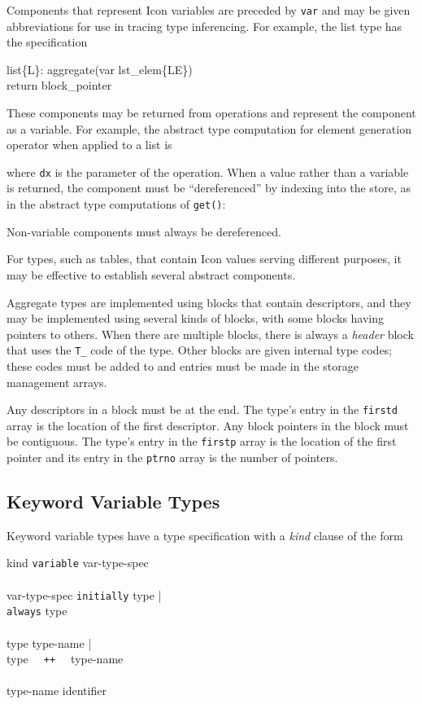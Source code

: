 Components that represent Icon variables are preceded by \texttt{var} and may
be given abbreviations for use in tracing type inferencing. For
example, the list type has the specification
\begin{iconcode}
list\{L\}: \>\>\> aggregate(var lst\_elem\{LE\})\\
\>\>\>            return block\_pointer
\end{iconcode}

\noindent

These components may be returned from operations and represent the
component as a variable. For example, the abstract type computation
for element generation operator when applied to a list is


\noindent
where \texttt{dx} is the parameter of the operation. When a value rather
than a variable is returned, the component must be ``dereferenced'' by
indexing into the store, as in the abstract type computations of
\texttt{get()}:


\noindent
Non-variable components must always be dereferenced.

For types, such as tables, that contain Icon values serving different
purposes, it may be effective to establish several abstract components.

Aggregate types are implemented using blocks that contain descriptors, and
they may be implemented using several kinds of blocks, with some blocks
having pointers to others. When there are multiple blocks, there is always
a \textit{header} block that uses the \texttt{T\_} code of the type. Other
blocks are given internal type codes; these codes must be added to
 and entries must be made in the storage management
arrays.

Any descriptors in a block must be at the end. The type's entry in the
\texttt{firstd} array is the location of the first descriptor. Any block
pointers in the block must be contiguous. The type's entry in the
\texttt{firstp} array is the location of the first pointer and its
entry in the \texttt{ptrno} array is the number of pointers.

\subsection{Keyword Variable Types}

Keyword variable types have a type specification with a \textit{kind}
clause of the form
\begin{ebnf}
kind \cceq \texttt{variable} var-type-spec\\
\\
var-type-spec \cceq \texttt{initially} type |\\
\>\>\>\>\>\>        \texttt{always} type\\
\\
type \cceq type-name |\\
\>\>\>     type \texttt{~~++~~} type-name\\
\\
type-name \cceq identifier
\end{ebnf}

